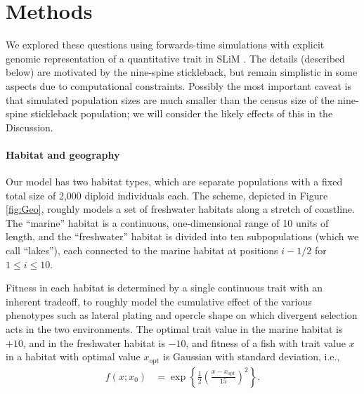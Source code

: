 \documentclass{article}
\newcommand{\plr}[1]{\todo[linecolor=blue,backgroundcolor=blue!25,bordercolor=blue]{#1}}
\begin{document}


\section{Methods}

We explored these questions
using forwards-time simulations with explicit genomic representation of a quantitative trait
in SLiM \citep{haller2017slim}.
The details (described below) are motivated by the nine-spine stickleback,
but remain simplistic in some aspects due to computational constraints.
Possibly the most important caveat is that simulated population sizes are much smaller
than the census size of the nine-spine stickleback population;
we will consider the likely effects of this in the Discussion.
\plr{TODO}


\paragraph{Habitat and geography}
Our model has two habitat types, which are separate populations
with a fixed total size of 2,000 diploid individuals each.
The scheme, depicted in Figure \ref{fig:Geo},
roughly models a set of freshwater habitats
along a stretch of coastline.
The ``marine'' habitat  is a continuous, one-dimensional range of 10 units of length,
and the ``freshwater'' habitat is divided into ten subpopulations
(which we call ``lakes''), each connected to the marine habitat
at positions $i - 1/2$ for $1 \le i \le 10$.

Fitness in each habitat is determined by a single continuous trait with an inherent tradeoff,
to roughly model the cumulative effect of the various phenotypes
such as lateral plating and opercle shape
on which divergent selection acts in the two environments.
The optimal trait value in the marine habitat is $+10$,
and in the freshwater habitat is $-10$,
and fitness of a fish with trait value $x$ in a habitat with optimal value $x_\text{opt}$ is
Gaussian with standard deviation, i.e.,
\begin{align*}
    f(x; x_0)
    &=
    \exp\left\{
        \frac{1}{2}
            \left(
            \frac{x-x_\text{opt}}{15}
            \right)^2
        \right\} .
\end{align*}
\end{document}
